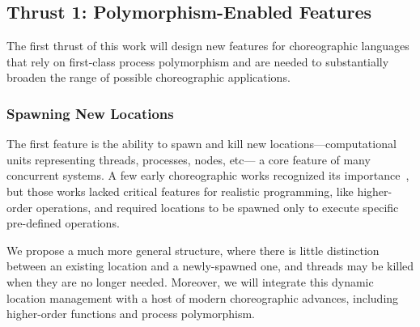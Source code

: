 
\subsection{Thrust 1: Polymorphism-Enabled Features}
\label{sec:t1}

The first thrust of this work will design new features for choreographic languages
that rely on first-class process polymorphism and
are needed to substantially broaden the range of possible choreographic applications.

\subsubsection{Spawning New Locations}

The first feature is the ability to spawn and kill new locations---computational units representing threads, processes, nodes, etc---%
a core feature of many concurrent systems.
A few early choreographic works recognized its importance~\citep{CarboneM13,CruzFilipeM16a},
but those works lacked critical features for realistic programming, like higher-order operations,
and required locations to be spawned only to execute specific pre-defined operations.

We propose a much more general structure, where there is little distinction between an existing location and a newly-spawned one,
and threads may be killed when they are no longer needed.
Moreover, we will integrate this dynamic location management with a host of modern choreographic advances,
including higher-order functions and process polymorphism.


%

